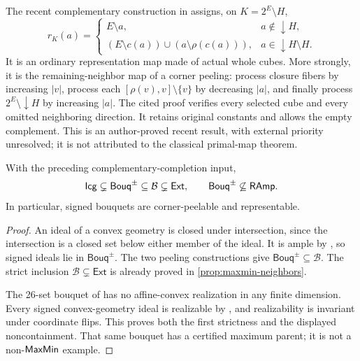 The recent complementary construction in
\cite[\texttt{thm:closure-completion}]{BouquetCompletion} assigns, on
$K=2^E\setminus H$,
\begin{equation}\label{eq:atlas-bouquet-complement}
 r_K(a)=
 \begin{cases}
 E\setminus a,&a\notin\downarrow H,\\
 (E\setminus c(a))\cup(a\setminus\rho(c(a))),
       &a\in\downarrow H\setminus H.
 \end{cases}
\end{equation}
It is an ordinary representation map made of actual whole cubes. More
strongly, it is the remaining-neighbor map of a corner peeling: process
closure fibers by increasing $|v|$, process each
$[\rho(v),v]\setminus\{v\}$ by decreasing $|a|$, and finally process
$2^E\setminus\downarrow H$ by increasing $|a|$.
The cited proof verifies every selected cube and every omitted neighboring
direction. It retains original constants and allows the empty complement.
This is an author-proved recent result, with external priority unresolved;
it is not attributed to the classical primal-map theorem.

\begin{proposition}
\label{prop:atlas-bouquet-position}
With the preceding complementary-completion input,
\[
 \mathsf{Icg}\subsetneq\mathsf{Bouq}^{\pm}
 \subseteq\mathcal B\subsetneq\mathsf{Ext},\qquad
 \mathsf{Bouq}^{\pm}\not\subseteq\mathsf{RAmp}.
\]
In particular, signed bouquets are corner-peelable and representable.
\end{proposition}
\begin{proof}
An ideal of a convex geometry is closed under intersection, since the
intersection is a closed set below either member of the ideal. It is ample
by \cite[\S2.5]{CCKGeometry}, so signed ideals lie in
$\mathsf{Bouq}^{\pm}$. The two peeling constructions give
$\mathsf{Bouq}^{\pm}\subseteq\mathcal B$.
The strict inclusion $\mathcal B\subsetneq\mathsf{Ext}$ is already proved
in \cref{prop:maxmin-neighbors}.

The 26-set bouquet of \cite{NonrealizableBouquet} has no affine-convex
realization in any finite dimension. Every signed convex-geometry ideal
is realizable by \cite[Theorem~26]{CCKGeometry}, and realizability is
invariant under coordinate flips. This proves both the first strictness
and the displayed noncontainment. That same bouquet has a certified
maximum parent; it is not a non-$\mathsf{MaxMin}$ example.
\end{proof}

